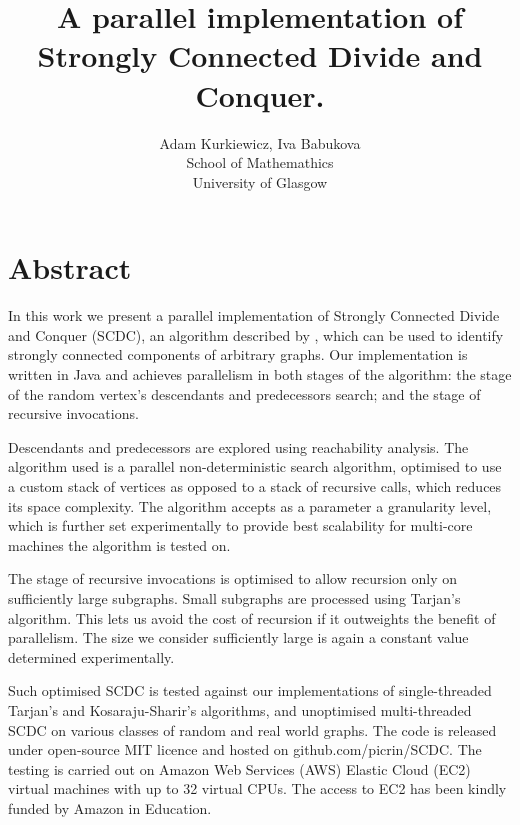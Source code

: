 \documentclass{article}
\title{A parallel implementation of Strongly Connected Divide and Conquer.}
\author{Adam Kurkiewicz, Iva Babukova\\ School of Mathemathics\\ University of Glasgow}
\date{}
\begin{document}
\maketitle

\section{Abstract}

\par
In this work we present a parallel implementation of Strongly Connected Divide and Conquer (SCDC), an algorithm described by \textcite{fleischer00}, which can be used to identify strongly connected components of arbitrary graphs. Our implementation is written in Java and achieves parallelism in both stages of the algorithm: the stage of the random vertex's descendants and predecessors search; and the stage of recursive invocations.

\par
Descendants and predecessors are explored using reachability analysis. The algorithm used is a parallel non-deterministic search algorithm, optimised to use a custom stack of vertices as opposed to a stack of recursive calls, which reduces its space complexity. The algorithm accepts as a parameter a granularity level, which is further set experimentally to provide best scalability for multi-core machines the algorithm is tested on.

\par
The stage of recursive invocations is optimised to allow recursion only on sufficiently large subgraphs. Small subgraphs are processed using Tarjan's \cite{tarjan72} algorithm. This lets us avoid the cost of recursion if it outweights the benefit of parallelism. The size we consider sufficiently large is again a constant value determined experimentally.

\par
Such optimised SCDC is tested against our implementations of single-threaded Tarjan's \cite{tarjan72} and Kosaraju-Sharir's \cite{sharir81} algorithms, and unoptimised multi-threaded SCDC \cite{fleischer00} on various classes of random and real world graphs. The code is released under open-source MIT licence and hosted on github.com/picrin/SCDC. The testing is carried out on Amazon Web Services (AWS) Elastic Cloud (EC2) virtual machines with up to 32 virtual CPUs. The access to EC2 has been kindly funded by Amazon in Education.

\printbibliography
\end{document}
